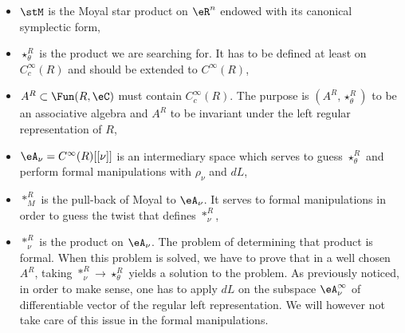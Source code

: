 \begin{itemize}
\item $\stM$ is the Moyal star product on $\eR^n$ endowed with its canonical symplectic form,
\item $\star^R_{\theta}$ is the product we are searching for. It has to be defined at least on $ C_c^{\infty}(R)$ and should be extended to $ C^{\infty}(R)$,
\item $A^R\subset\Fun(R,\eC)$ must contain $ C^{\infty}_c(R)$. The purpose is $(A^R,\star^R_{\theta})$ to be an associative algebra and $A^R$ to be invariant under the left regular representation of $R$,
\item $\eA_{\nu}= C^{\infty}(R)[ [\nu]]$ is an intermediary space which serves to guess $\star^R_{\theta}$ and perform formal manipulations with $\rho_{\nu}$ and $dL$,
\item $\ast_M^R$ is the pull-back of Moyal to $\eA_{\nu}$. It serves to formal manipulations in order to guess the twist that defines $\ast^R_{\nu}$,
\item $\ast^R_{\nu}$ is the product on $\eA_{\nu}$. The problem of determining that product is formal. When this problem is solved, we have to prove that in a well chosen $A^R$, taking $\ast_{\nu}^R\to\star^R_{\theta}$ yields a solution to the problem. As previously noticed, in order to make sense, one has to apply $dL$ on the subspace $\eA_{\nu}^{\infty}$ of differentiable vector of the regular left representation. We will however not take care of this issue in the formal manipulations.
\end{itemize}

